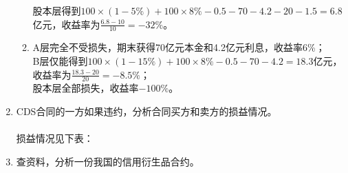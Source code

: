 \begin{enumerate}
\begin{enumerate}[label=(\arabic*)]
        股本层得到$100 \times (1-5\%) + 100 \times 8\% - 0.5 - 70 - 4.2 - 20 - 1.5 = 6.8$亿元，收益率为$\displaystyle \frac{6.8-10}{10}=-32\%$。
        \item A层完全不受损失，期末获得70亿元本金和4.2亿元利息，收益率6\%；\\
        B层仅能得到$100 \times (1-15\%) + 100 \times 8\% - 0.5 - 70 - 4.2 = 18.3$亿元，收益率为$\displaystyle \frac{18.3-20}{20} = -8.5 \%$；\\
        股本层全部损失，收益率$-100 \%$。
    \end{enumerate}
    \item CDS合同的一方如果违约，分析合同买方和卖方的损益情况。\\
    \sol\\
    损益情况见下表：
    \begin{center}
    \end{center}
    \item 查资料，分析一份我国的信用衍生品合约。\\
    \omitted
\end{enumerate}